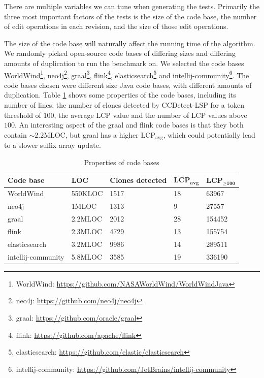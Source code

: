 There are multiple variables we can tune when generating the tests. Primarily the three
most important factors of the tests is the size of the code base, the number of edit
operations in each revision, and the size of those edit operations.

The size of the code base will naturally affect the running time of the algorithm. We
randomly picked open-source code bases of differing sizes and differing amounts of
duplication to run the benchmark on. We selected the code bases
WorldWind\footnote{WorldWind: \url{https://github.com/NASAWorldWind/WorldWindJava}},
neo4j\footnote{neo4j: \url{https://github.com/neo4j/neo4j}}, graal\footnote{graal:
\url{https://github.com/oracle/graal}}, flink\footnote{flink:
\url{https://github.com/apache/flink}}, elasticsearch\footnote{elasticsearch:
\url{https://github.com/elastic/elasticsearch}} and
intellij-community\footnote{intellij-community:
\url{https://github.com/JetBrains/intellij-community}}. The code bases chosen were
different size Java code bases, with different amounts of duplication. Table
\ref{tab:codebases} shows some properties of the code bases, including its number of
lines, the number of clones detected by CCDetect-LSP for a token threshold of $100$, the
average LCP value and the number of LCP values above $100$. An interesting aspect of the
graal and flink code bases is that they both contain ${\sim}2.2\text{MLOC}$, but graal has
a higher $\text{LCP}_\text{avg}$, which could potentially lead to a slower suffix array
update.

\begin{table}[t]
    \begin{center}
        \begin{tabular}[c]{|l|l|l|l|l|}
            \hline
            \textbf{Code base} & \textbf{LOC} & \textbf{Clones detected} &
            $\textbf{LCP}_{\textbf{avg}}$ & $\textbf{LCP}_{\geq \textbf{100}}$ \\
            \hline
            WorldWind & 550KLOC & 1517 & 18 & 63967\\
            \hline
            neo4j & 1MLOC & 1313 & 9 & 27557\\
            \hline
            graal & 2.2MLOC & 2012 & 28 & 154452\\
            \hline
            flink & 2.3MLOC & 4729 & 13 & 155754\\
            \hline
            elasticsearch & 3.2MLOC & 9986 & 14 & 289511 \\
            \hline
            intellij-community & 5.8MLOC & 3585 & 19 & 336190 \\
            \hline
        \end{tabular}
    \end{center}
    \caption{Properties of code bases}
    \label{tab:codebases}
\end{table}

